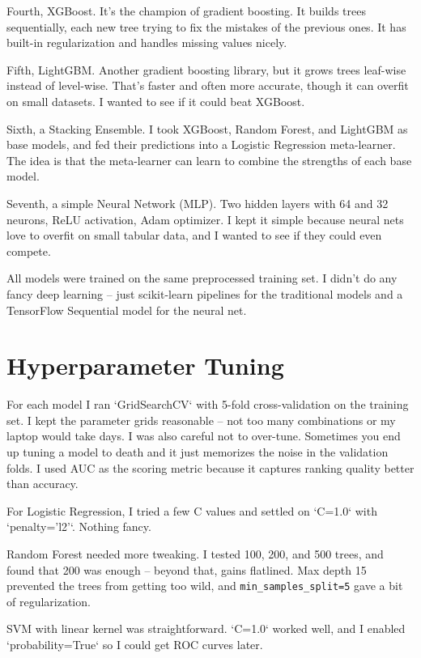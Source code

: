 \documentclass[12pt, a4paper, oneside]{book}
\begin{document}
Fourth, XGBoost. It's the champion of gradient boosting. It builds trees sequentially, each new tree trying to fix the mistakes of the previous ones. It has built-in regularization and handles missing values nicely.

Fifth, LightGBM. Another gradient boosting library, but it grows trees leaf-wise instead of level-wise. That's faster and often more accurate, though it can overfit on small datasets. I wanted to see if it could beat XGBoost.

Sixth, a Stacking Ensemble. I took XGBoost, Random Forest, and LightGBM as base models, and fed their predictions into a Logistic Regression meta-learner. The idea is that the meta-learner can learn to combine the strengths of each base model.

Seventh, a simple Neural Network (MLP). Two hidden layers with 64 and 32 neurons, ReLU activation, Adam optimizer. I kept it simple because neural nets love to overfit on small tabular data, and I wanted to see if they could even compete.

All models were trained on the same preprocessed training set. I didn't do any fancy deep learning -- just scikit-learn pipelines for the traditional models and a TensorFlow Sequential model for the neural net.

\section{Hyperparameter Tuning}
For each model I ran `GridSearchCV` with 5-fold cross-validation on the training set. I kept the parameter grids reasonable -- not too many combinations or my laptop would take days. I was also careful not to over-tune. Sometimes you end up tuning a model to death and it just memorizes the noise in the validation folds. I used AUC as the scoring metric because it captures ranking quality better than accuracy.

For Logistic Regression, I tried a few C values and settled on `C=1.0` with `penalty='l2'`. Nothing fancy.

Random Forest needed more tweaking. I tested 100, 200, and 500 trees, and found that 200 was enough -- beyond that, gains flatlined. Max depth 15 prevented the trees from getting too wild, and \texttt{min\_samples\_split=5} gave a bit of regularization.

SVM with linear kernel was straightforward. `C=1.0` worked well, and I enabled `probability=True` so I could get ROC curves later.
\end{document}
